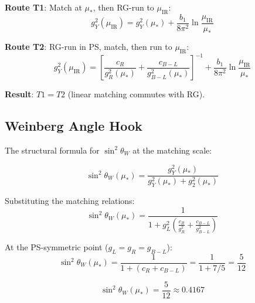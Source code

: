 \documentclass[11pt,a4paper]{article}
\begin{document}
\begin{invariancebox}
\label{box:two-route}
\textbf{Route T1}: Match at $\mu_*$, then RG-run to $\mu_{\text{IR}}$:
\begin{equation}
\label{eq:route-T1}
g_Y^2(\mu_{\text{IR}}) = g_Y^2(\mu_*) + \frac{b_1}{8\pi^2} \ln\frac{\mu_{\text{IR}}}{\mu_*}
\end{equation}

\textbf{Route T2}: RG-run in PS, match, then run to $\mu_{\text{IR}}$:
\begin{equation}
\label{eq:route-T2}
g_Y^2(\mu_{\text{IR}}) = \left[\frac{c_R}{g_R^2(\mu_*)} + \frac{c_{B-L}}{g_{B-L}^2(\mu_*)}\right]^{-1} + \frac{b_1}{8\pi^2} \ln\frac{\mu_{\text{IR}}}{\mu_*}
\end{equation}

\textbf{Result}: $T1 = T2$ (linear matching commutes with RG).
\end{invariancebox}

\subsection{Weinberg Angle Hook}
\label{subsec:weinberg-hook}

The structural formula for $\sin^2\theta_W$ at the matching scale:

\begin{equation}
\label{eq:weinberg-hook}
\sin^2\theta_W(\mu_*) = \frac{g_Y^2(\mu_*)}{g_Y^2(\mu_*) + g_2^2(\mu_*)}
\end{equation}

Substituting the matching relations:
\begin{equation}
\label{eq:weinberg-expanded}
\sin^2\theta_W(\mu_*) = \frac{1}{1 + g_L^2\left(\frac{c_R}{g_R^2} + \frac{c_{B-L}}{g_{B-L}^2}\right)}
\end{equation}

At the PS-symmetric point ($g_L = g_R = g_{B-L}$):
\begin{equation}
\label{eq:weinberg-symmetric}
\sin^2\theta_W(\mu_*) = \frac{1}{1 + (c_R + c_{B-L})} = \frac{1}{1 + 7/5} = \frac{5}{12}
\end{equation}

\begin{predictionbox}
\label{box:prediction-weinberg}
\begin{equation}
\label{eq:weinberg-prediction}
\boxed{\sin^2\theta_W(\mu_*) = \frac{5}{12} \approx 0.4167}
\end{equation}
\end{predictionbox}
\end{document}
